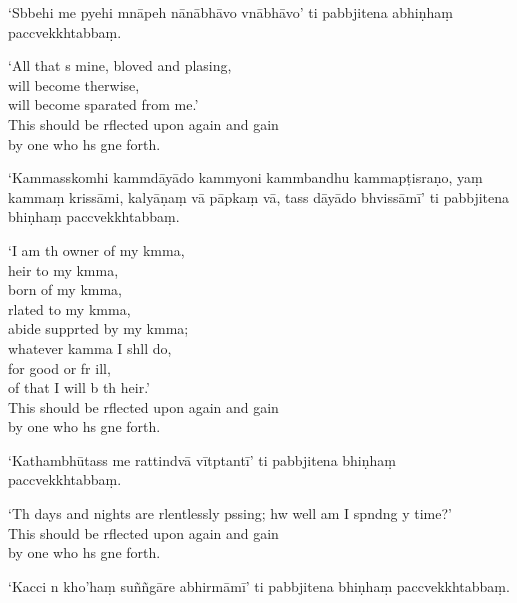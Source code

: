 `Sbbehi me pyehi mnāpeh nānābhāvo
vnābhāvo' ti pabbjitena abhiṇhaṃ
paccvekkhtabbaṃ.

\begin{english}
`All that s mine, bloved and plasing,\\
will become therwise,\\
will become sparated from me.'\\
This should be rflected upon again and gain\\
by one who hs gne forth.
\end{english}

`Kammasskomhi kammdāyādo kammyoni kammbandhu
kammapṭisraṇo, yaṃ kammaṃ krissāmi, kalyāṇaṃ vā
pāpkaṃ vā, tass dāyādo bhvissāmī' ti pabbjitena
bhiṇhaṃ paccvekkhtabbaṃ.

\begin{english}
`I am th owner of my kmma,\\
heir to my kmma,\\
born of my kmma,\\
rlated to my kmma,\\
abide supprted by my kmma;\\
whatever kamma I shll do,\\
for good or fr ill,\\
of that I will b th heir.'\\
This should be rflected upon again and gain\\
by one who hs gne forth.
\end{english}

`Kathambhūtass me rattindvā vītptantī' ti
pabbjitena bhiṇhaṃ paccvekkhtabbaṃ.

\begin{english}
`Th days and nights are rlentlessly pssing; hw well am I spndng y time?'\\
This should be rflected upon again and gain\\
by one who hs gne forth.
\end{english}

`Kacci n kho'haṃ suññgāre abhirmāmī' ti
pabbjitena bhiṇhaṃ paccvekkhtabbaṃ.


